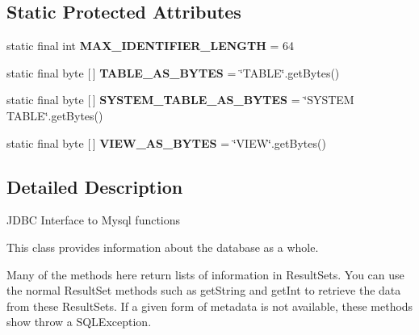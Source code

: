 \subsection*{Static Protected Attributes}
\begin{DoxyCompactItemize}
\item 
\mbox{\label{classcom_1_1mysql_1_1jdbc_1_1_database_meta_data_ae8ea97360b67806a37c887c4eb84424a}} 
static final int {\bfseries M\+A\+X\+\_\+\+I\+D\+E\+N\+T\+I\+F\+I\+E\+R\+\_\+\+L\+E\+N\+G\+TH} = 64
\item 
\mbox{\label{classcom_1_1mysql_1_1jdbc_1_1_database_meta_data_a358f29c8126f700c4db122bf4b26699d}} 
static final byte \mbox{[}$\,$\mbox{]} {\bfseries T\+A\+B\+L\+E\+\_\+\+A\+S\+\_\+\+B\+Y\+T\+ES} = \char`\"{}T\+A\+B\+LE\char`\"{}.get\+Bytes()
\item 
\mbox{\label{classcom_1_1mysql_1_1jdbc_1_1_database_meta_data_a86e71b9e35e70fb069aa7cef6cfa840b}} 
static final byte \mbox{[}$\,$\mbox{]} {\bfseries S\+Y\+S\+T\+E\+M\+\_\+\+T\+A\+B\+L\+E\+\_\+\+A\+S\+\_\+\+B\+Y\+T\+ES} = \char`\"{}S\+Y\+S\+T\+EM T\+A\+B\+LE\char`\"{}.get\+Bytes()
\item 
\mbox{\label{classcom_1_1mysql_1_1jdbc_1_1_database_meta_data_a6998669139e19ff8a91db1c0abc1e853}} 
static final byte \mbox{[}$\,$\mbox{]} {\bfseries V\+I\+E\+W\+\_\+\+A\+S\+\_\+\+B\+Y\+T\+ES} = \char`\"{}V\+I\+EW\char`\"{}.get\+Bytes()
\end{DoxyCompactItemize}


\subsection{Detailed Description}
J\+D\+BC Interface to Mysql functions 

This class provides information about the database as a whole. 

Many of the methods here return lists of information in Result\+Sets. You can use the normal Result\+Set methods such as get\+String and get\+Int to retrieve the data from these Result\+Sets. If a given form of metadata is not available, these methods show throw a S\+Q\+L\+Exception. 

